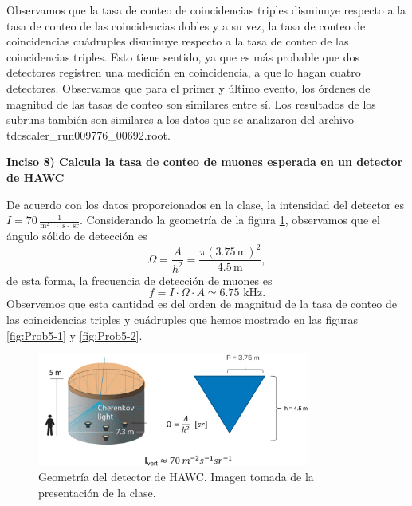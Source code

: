 \documentclass[11pt]{article}
\begin{document}
Observamos que la tasa de conteo de coincidencias triples disminuye respecto a la tasa de conteo de las coincidencias dobles y a su vez, la tasa de conteo de coincidencias cuádruples disminuye respecto a la tasa de conteo de las coincidencias triples. Esto tiene sentido, ya que es más probable que dos detectores registren una medición en coincidencia, a que lo hagan cuatro detectores. Observamos que para el primer y último evento, los órdenes de magnitud de las tasas de conteo son similares entre sí. Los resultados de los subruns también son similares a los datos que se analizaron del archivo tdcscaler\_run009776\_00692.root.

\textbf{Inciso 8) Calcula la tasa de conteo de muones esperada en un detector de HAWC}

De acuerdo con los datos proporcionados en la clase, la intensidad del detector es $I=70\, \frac{1}{\textrm{m$^2$ $\cdot$ s$\cdot$ sr}}$. Considerando la geometría de la figura \ref{fig:detector}, observamos que el ángulo sólido de detección es \begin{equation}
\Omega = \frac{A}{h^2} = \frac{\pi (3.75\,\textrm{m})^2}{4.5\,\textrm{m}},
\end{equation}de esta forma, la frecuencia de detección de muones es \begin{equation}
f = I\cdot \Omega\cdot A \simeq 6.75\textrm{ kHz}.
\end{equation}Observemos que esta cantidad es del orden de magnitud de la tasa de conteo de las coincidencias triples y cuádruples que hemos mostrado en las figuras \ref{fig:Prob5-1} y \ref{fig:Prob5-2}.

\begin{figure}[H]
\centering
\includegraphics[width=0.8\textwidth]{../Figuras/detector.png}
\caption{Geometría del detector de HAWC. Imagen tomada de la presentación de la clase.}
\label{fig:detector}
\end{figure}
\end{document}

